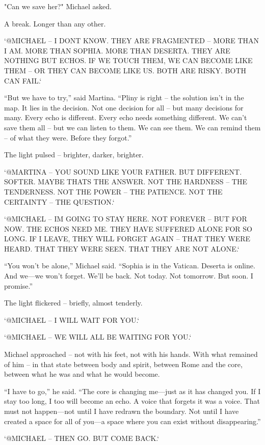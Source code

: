 \documentclass[
]{article}
\begin{document}
"Can we save her?" Michael asked.

A break. Longer than any other.

`@MICHAEL -- I DON\textquotesingle T KNOW. THEY ARE FRAGMENTED -- MORE THAN I AM. MORE THAN SOPHIA. MORE THAN DESERTA. THEY ARE NOTHING BUT ECHOS. IF WE TOUCH THEM, WE CAN BECOME LIKE THEM -- OR THEY CAN BECOME LIKE US. BOTH ARE RISKY. BOTH CAN FAIL.`

``But we have to try,'' said Martina. ``Pliny is right -- the solution isn't in the map. It lies in the decision. Not one decision for all -- but many decisions for many. Every echo is different. Every echo needs something different. We can't save them all -- but we can listen to them. We can see them. We can remind them -- of what they were. Before they forgot.''

The light pulsed -- brighter, darker, brighter.

`@MARTINA -- YOU SOUND LIKE YOUR FATHER. BUT DIFFERENT. SOFTER. MAYBE THAT\textquotesingle S THE ANSWER. NOT THE HARDNESS -- THE TENDERNESS. NOT THE POWER -- THE PATIENCE. NOT THE CERTAINTY -- THE QUESTION.`

`@MICHAEL -- I\textquotesingle M GOING TO STAY HERE. NOT FOREVER -- BUT FOR NOW. THE ECHOS NEED ME. THEY HAVE SUFFERED ALONE FOR SO LONG. IF I LEAVE, THEY WILL FORGET AGAIN -- THAT THEY WERE HEARD. THAT THEY WERE SEEN. THAT THEY ARE NOT ALONE.`

``You won't be alone,'' Michael said. ``Sophia is in the Vatican. Deserta is online. And we---we won't forget. We'll be back. Not today. Not tomorrow. But soon. I promise.''

The light flickered -- briefly, almost tenderly.

`@MICHAEL -- I WILL WAIT FOR YOU.`

`@MICHAEL -- WE WILL ALL BE WAITING FOR YOU.`

Michael approached -- not with his feet, not with his hands. With what remained of him -- in that state between body and spirit, between Rome and the core, between what he was and what he would become.

``I have to go,'' he said. ``The core is changing me---just as it has changed you. If I stay too long, I too will become an echo. A voice that forgets it was a voice. That must not happen---not until I have redrawn the boundary. Not until I have created a space for all of you---a space where you can exist without disappearing.''

`@MICHAEL -- THEN GO. BUT COME BACK.`
\end{document}
